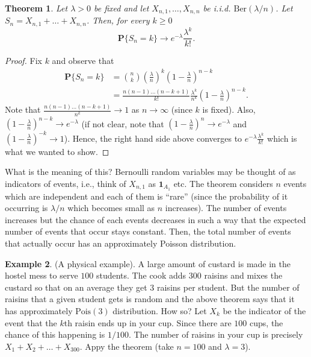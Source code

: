\documentclass[preprint,  11pt]{amsart}
\theoremstyle{plain} %
\newtheorem{theorem}{Theorem}
\theoremstyle{definition} %
\newtheorem{example}[theorem]{Example}
\begin{document}
\begin{theorem} Let $\lambda>0$ be fixed and let $X_{n,1},\ldots ,X_{n,n}$ be i.i.d. $\mbox{Ber}(\lambda/n)$. Let $S_{n}=X_{n,1}+\ldots +X_{n,n}$. Then, for every $k\ge 0$
$$
\mathbf{P}\{S_{n}=k\}\rightarrow e^{-\lambda}\frac{\lambda^{k}}{k!}.
$$
\end{theorem}
\begin{proof} Fix $k$ and observe that
\begin{align*}
\mathbf{P}\{S_{n}=k\} &= \binom{n}{k}\left(\frac{\lambda}{n}\right)^{k}\left(1-\frac{\lambda}{n}\right)^{n-k} \\
 &= \frac{n(n-1)\ldots (n-k+1)}{k!}\frac{\lambda^{k}}{n^{k}}\left(1-\frac{\lambda}{n}\right)^{n-k}.
 \end{align*}
Note that $\frac{n(n-1)\ldots(n-k+1)}{n^{k}}\rightarrow 1$ as $n\rightarrow \infty$ (since $k$ is fixed). Also, $(1-\frac{\lambda}{n})^{n-k}\rightarrow e^{-\lambda}$ (if not clear, note that $(1-\frac{\lambda}{n})^{n}\rightarrow e^{-\lambda}$ and $(1-\frac{\lambda}{n})^{-k}\rightarrow 1$). Hence, the right hand side above converges to $e^{-\lambda}\frac{\lambda^{k}}{k!}$ which is what we wanted to show.
\end{proof}
What is the meaning of this? Bernoulli random variables may be thought of as indicators of events, i.e., think of $X_{n,1}$ as ${\mathbf 1}_{A_{1}}$ etc. The theorem considers $n$ events which are independent and each of them is ``rare'' (since the probability of it occurring is $\lambda/n$ which becomes small as $n$ increases). The number of events increases but the chance of each events decreases in such a way that the expected number of events that occur stays constant. Then, the total number of events that actually occur has an approximately Poisson distribution.
\begin{example} (A physical example). A large amount of custard is made in the hostel mess to serve $100$ students. The cook adds $300$ raisins and mixes the custard so that on an average they get $3$ raisins per student. But the number of raisins that a given student gets is random and the above theorem says that it has approximately $\mbox{Pois}(3)$ distribution. How so? Let $X_{k}$ be the indicator of the event that the $k$th raisin ends up in your cup. Since there are $100$ cups, the chance of this happening is $1/100$. The number of raisins in your cup is precisely $X_{1}+X_{2}+\ldots +X_{300}$. Appy the theorem (take $n=100$ and $\lambda=3$).
\end{example}
\end{document}
